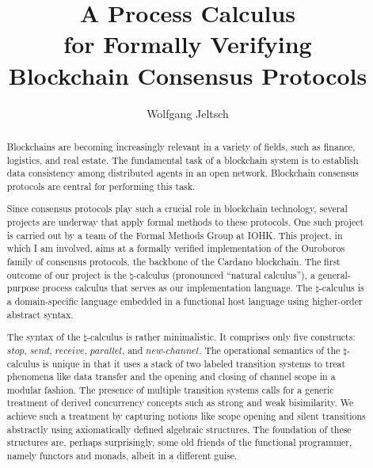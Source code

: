 \documentclass{llncs}
\begin{document}
\title{%
    A Process Calculus\\
    for Formally Verifying\\
    Blockchain Consensus Protocols%
}
\author{Wolfgang Jeltsch}
\maketitle

\begin{abstract}

Blockchains are becoming increasingly relevant in a variety of fields,
such as finance, logistics, and real estate. The fundamental task of a
blockchain system is to establish data consistency among distributed
agents in an open network. Blockchain consensus protocols are central
for performing this task.

Since consensus protocols play such a crucial role in blockchain
technology, several projects are underway that apply formal methods to
these protocols. One such project is carried out by a team of the Formal
Methods Group at IOHK. This project, in which I am involved, aims at a
formally verified implementation of the Ouroboros family of consensus
protocols, the backbone of the Cardano blockchain. The first outcome of
our project is the $\natural$-calculus (pronounced ``natural
calculus''), a general-purpose process calculus that serves as our
implementation language. The $\natural$-calculus is a domain-specific
language embedded in a functional host language using higher-order
abstract syntax.

The syntax of the $\natural$-calculus is rather minimalistic. It
comprises only five constructs: $\mathit{stop}$, $\mathit{send}$,
$\mathit{receive}$, $\mathit{parallel}$, and
$\mathit{new\text{-}channel}$. The operational semantics of the
$\natural$-calculus is unique in that it uses a stack of two labeled
transition systems to treat phenomena like data transfer and the opening
and closing of channel scope in a modular fashion. The presence of
multiple transition systems calls for a generic treatment of derived
concurrency concepts such as strong and weak bisimilarity. We achieve
such a treatment by capturing notions like scope opening and silent
transitions abstractly using axiomatically defined algebraic structures.
The foundation of these structures are, perhaps surprisingly, some old
friends of the functional programmer, namely functors and monads, albeit
in a different guise.


\end{abstract}
\end{document}
